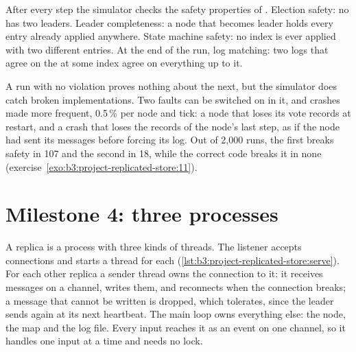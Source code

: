 \label{lst:b3:project-replicated-store:sim}

After every step the simulator checks the safety properties of . Election safety: no  has two leaders. Leader completeness: a node that becomes leader holds every entry already applied anywhere. State machine safety: no index is ever applied with two different entries. At the end of the run, log matching: two logs that agree on the  at some index agree on everything up to it.

\label{out:b3:project-replicated-store:m3}

A run with no violation proves nothing about the next, but the simulator does catch broken implementations. Two faults can be switched on in it, and crashes made more frequent, 0.5\,\% per node and tick: a node that loses its vote records at restart, and a crash that loses the records of the node's last step, as if the node had sent its messages before forcing its log. Out of 2,000 runs, the first breaks safety in 107 and the second in 18, while the correct code breaks it in none (exercise~\ref{exo:b3:project-replicated-store:11}).

\section{Milestone 4: three processes}\label{sec:b3:project-replicated-store:network}

A replica is a process with three kinds of threads. The listener accepts connections and starts a thread for each (\cref{lst:b3:project-replicated-store:serve}). For each other replica a sender thread owns the connection to it: it receives  messages on a channel, writes them, and reconnects when the connection breaks; a message that cannot be written is dropped, which  tolerates, since the leader sends again at its next heartbeat. The main loop owns everything else: the  node, the map and the log file. Every input reaches it as an event on one channel, so it handles one input at a time and needs no lock.

